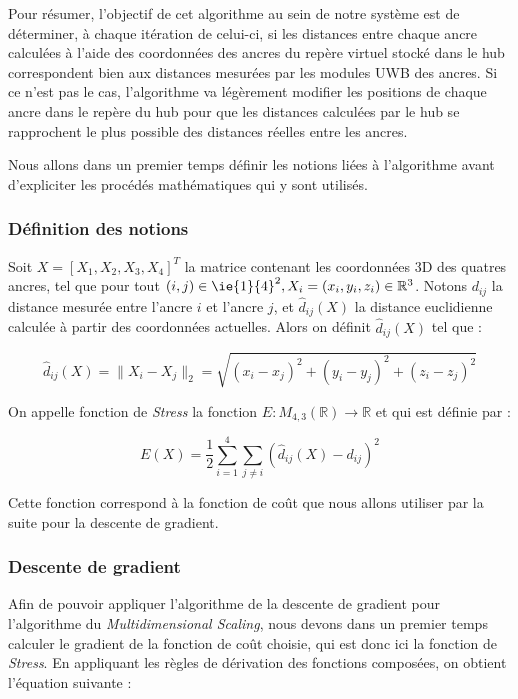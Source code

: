 Pour résumer, l'objectif de cet algorithme au sein de notre système est de déterminer, à chaque itération de celui-ci, si les distances entre chaque ancre calculées à l'aide des coordonnées des ancres du repère virtuel stocké dans le hub correspondent bien aux distances mesurées par les modules UWB des ancres. Si ce n'est pas le cas, l'algorithme va légèrement modifier les positions de chaque ancre dans le repère du hub pour que les distances calculées par le hub se rapprochent le plus possible des distances réelles entre les ancres.

Nous allons dans un premier temps définir les notions liées à l'algorithme avant d'expliciter les procédés mathématiques qui y sont utilisés.

\subsubsection{Définition des notions}

\begin{definition}
   Soit $X = [X_1, X_2, X_3, X_4]^T$ la matrice contenant les coordonnées 3D des quatres ancres, tel que pour tout $ (i,j) \in \ie{1}{4}^2, X_i = (x_i, y_i, z_i) \in \mathbb{R}^3$. Notons $d_{ij}$ la distance mesurée entre l'ancre $i$ et l'ancre $j$, et $\hat{d}_{ij}(X)$ la distance euclidienne calculée à partir des coordonnées actuelles. Alors on définit $\hat{d}_{ij}(X)$ tel que :
   
   $$\hat{d}_{ij}(X) = \|X_i - X_j\|_2 = \sqrt{(x_i - x_j)^2 + (y_i - y_j)^2 + (z_i - z_j)^2}$$
\end{definition}

\begin{definition}
   On appelle fonction de \emph{Stress} la fonction $E:M_{4,3}(\mathbb{R})\rightarrow\mathbb{R}$ et qui est définie par :

   $$E(X) = \frac{1}{2} \sum_{i=1}^{4} \sum_{j \neq i} \left( \hat{d}_{ij}(X) - d_{ij} \right)^2$$

   Cette fonction correspond à la fonction de coût que nous allons utiliser par la suite pour la descente de gradient.
\end{definition}

\subsubsection{Descente de gradient}

Afin de pouvoir appliquer l'algorithme de la descente de gradient pour l'algorithme du \emph{Multidimensional Scaling}, nous devons dans un premier temps calculer le gradient de la fonction de coût choisie, qui est donc ici la fonction de \emph{Stress}. En appliquant les règles de dérivation des fonctions composées, on obtient l'équation suivante :

